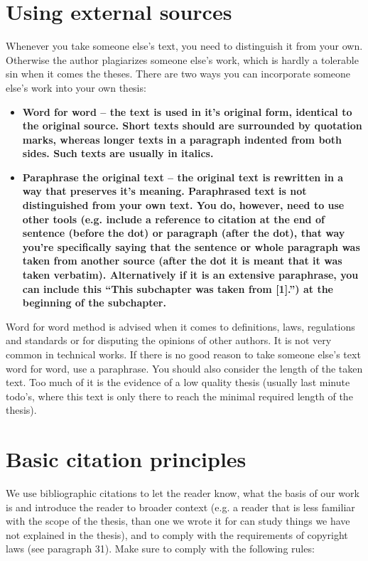 \section{Using external sources}

Whenever you take someone else's text, you need to distinguish it from your own. Otherwise the author plagiarizes someone else's work, which is hardly a tolerable sin when it comes the theses. There are two ways you can incorporate someone else's work into your own thesis:

\begin{itemize}
  \item{\bf Word for word \rm -- the text is used in it's original form, identical to the original source. Short texts should are surrounded by quotation marks, whereas longer texts in a paragraph indented from both sides. Such texts are usually in italics.}
  \item{\bf Paraphrase the original text \rm -- the original text is rewritten in a way that preserves it's meaning. Paraphrased text is not distinguished from your own text. You do, however, need to use other tools (e.g. include a reference to citation at the end of sentence (before the dot) or paragraph (after the dot), that way you're specifically saying that the sentence or whole paragraph was taken from another source (after the dot it is meant that it was taken verbatim). Alternatively if it is an extensive paraphrase, you can include this ``This subchapter was taken from [1].'') at the beginning of the subchapter.} 
\end{itemize}

Word for word method is advised when it comes to definitions, laws, regulations and standards or for disputing the opinions of other authors. It is not very common in technical works. If there is no good reason to take someone else's text word for word, use a paraphrase. You should also consider the length of the taken text. Too much of it is the evidence of a low quality thesis (usually last minute todo's, where this text is only there to reach the minimal required length of the thesis).

\section{Basic citation principles}

We use bibliographic citations to let the reader know, what the basis of our work is and introduce the reader to broader context (e.g. a reader that is less familiar with the scope of the thesis, than one we wrote it for can study things we have not explained in the thesis), and to comply with the requirements of copyright laws (see paragraph 31). Make sure to comply with the following rules:

